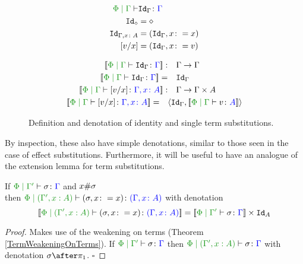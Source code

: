 \begin{figure}[H]
    \centering

    \begin{minipage}{.45\linewidth}
        \begin{framed}
            \begin{align*}
                \etyperelation{\P}{\G}{&\Id{\G}}{\G}\\
                \Id{\nil} & = \nil\\
                \Id{\gax} & = (\idg, x\setto x)\\
                \ssub{x}{v} & = (\idg, x\setto v)
            \end{align*}
        \end{framed}
    \end{minipage}
    \quad
    \begin{minipage}{.45\linewidth}
        \begin{framed}
            \begin{align*}
                \deno{\etyperelation{\P}{\G}{\Id{\G}}{\G}}: &\quad \G\rightarrow\G\\
                \deno{\etyperelation{\P}{\G}{\Id{\G}}{\G}} = &\quad  \idg\\
                \deno{\etyperelation{\P}{\G}{\ssub{x}{v}}{\gax}}: &\quad \G\rightarrow \G\times A\\
                \deno{\etyperelation{\P}{\G}{\ssub{x}{v}}{\gax}} =\quad & \pr{\idg}{\deno{\gpetyperelation{v}{A}}}
            \end{align*}
        \end{framed}
    \end{minipage}
    
    \caption{Definition and denotation of identity and single term substitutions.}
    \label{TermSubstitutionIdAndSingle}
\end{figure}



By inspection, these also have simple denotations, similar to those seen in the case of effect substitutions. Furthermore, it will be useful to have an analogue of the extension lemma for term substitutions.


\begin{framed}
    \begin{lemma}
        If $\etyperelation{\P}{\G'}{\si}{\G}$ and $x\#\sigma$\\ then $\etyperelation{\P}{(\G',x: A)}{(\si, x\setto x)}{(\gax)}$ with denotation $$\deno{\etyperelation{\P}{(\G',x: A)}{(\si, x\setto x)}{(\gax)}} = \deno{\etyperelation{\P}{\G'}{\si}{\G}} \times \Id{A}$$
    \end{lemma}
    
    \begin{proof}
         Makes use of the weakening on terms (Theorem \ref{TermWeakeningOnTerms}). If $\etyperelation{\P}{\G'}{\si}{\G}$ then $\etyperelation{\P}{(\G', x:A) }{\si}{\G}$ with denotation $\si\after\p$. $\square$
    \end{proof}
\end{framed}


